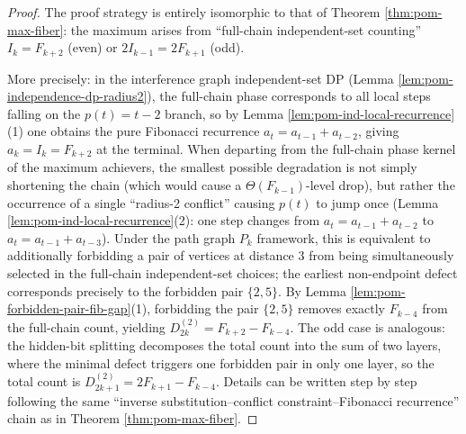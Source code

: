 \begin{proof}
The proof strategy is entirely isomorphic to that of Theorem \ref{thm:pom-max-fiber}: the maximum arises from ``full-chain independent-set counting'' \(I_k=F_{k+2}\) (even) or \(2I_{k-1}=2F_{k+1}\) (odd).
\par
More precisely: in the interference graph independent-set DP (Lemma \ref{lem:pom-independence-dp-radius2}), the full-chain phase corresponds to all local steps falling on the \(p(t)=t-2\) branch, so by Lemma \ref{lem:pom-ind-local-recurrence}(1) one obtains the pure Fibonacci recurrence \(a_t=a_{t-1}+a_{t-2}\), giving \(a_k=I_k=F_{k+2}\) at the terminal.
When departing from the full-chain phase kernel of the maximum achievers, the smallest possible degradation is not simply shortening the chain (which would cause a \(\Theta(F_{k-1})\)-level drop), but rather the occurrence of a single ``radius-2 conflict'' causing \(p(t)\) to jump once (Lemma \ref{lem:pom-ind-local-recurrence}(2): one step changes from \(a_t=a_{t-1}+a_{t-2}\) to \(a_t=a_{t-1}+a_{t-3}\)).
Under the path graph \(P_k\) framework, this is equivalent to additionally forbidding a pair of vertices at distance \(3\) from being simultaneously selected in the full-chain independent-set choices; the earliest non-endpoint defect corresponds precisely to the forbidden pair \(\{2,5\}\).
By Lemma \ref{lem:pom-forbidden-pair-fib-gap}(1), forbidding the pair \(\{2,5\}\) removes exactly \(F_{k-4}\) from the full-chain count, yielding
\(
D_{2k}^{(2)}=F_{k+2}-F_{k-4}
\).
The odd case is analogous: the hidden-bit splitting decomposes the total count into the sum of two layers, where the minimal defect triggers one forbidden pair in only one layer, so the total count is
\(
D_{2k+1}^{(2)}=2F_{k+1}-F_{k-4}
\).
Details can be written step by step following the same ``inverse substitution--conflict constraint--Fibonacci recurrence'' chain as in Theorem \ref{thm:pom-max-fiber}.
\end{proof}
